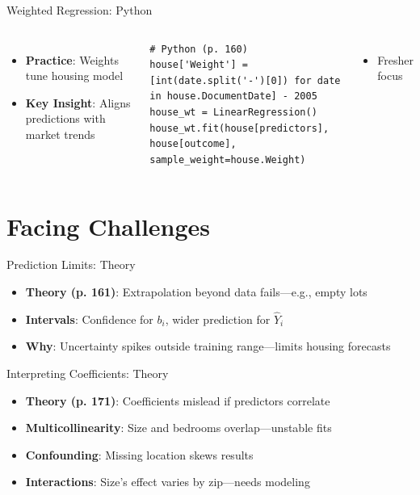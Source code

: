 \documentclass{beamer}
\begin{document}
	\begin{frame}[fragile]{Weighted Regression: Python}
		\lstset{language=Python}
		\begin{columns}
			\begin{itemize}
				\item \textbf{Practice}: Weights tune housing model
				\item \textbf{Key Insight}: Aligns predictions with market trends
			\end{itemize}
			\begin{lstlisting}
# Python (p. 160)
house['Weight'] = [int(date.split('-')[0]) for date in house.DocumentDate] - 2005
house_wt = LinearRegression()
house_wt.fit(house[predictors], house[outcome], sample_weight=house.Weight)
			\end{lstlisting}
			\begin{itemize}
				\item Fresher focus
			\end{itemize}
		\end{columns}
	\end{frame}
	
	\section{Facing Challenges}
	
	\begin{frame}{Prediction Limits: Theory}
		\begin{itemize}
			\item \textbf{Theory (p. 161)}: Extrapolation beyond data fails—e.g., empty lots
			\item \textbf{Intervals}: Confidence for $b_i$, wider prediction for $\hat{Y}_i$
			\item \textbf{Why}: Uncertainty spikes outside training range—limits housing forecasts
		\end{itemize}
	\end{frame}
	
	\begin{frame}{Interpreting Coefficients: Theory}
		\begin{itemize}
			\item \textbf{Theory (p. 171)}: Coefficients mislead if predictors correlate
			\item \textbf{Multicollinearity}: Size and bedrooms overlap—unstable fits
			\item \textbf{Confounding}: Missing location skews results
			\item \textbf{Interactions}: Size’s effect varies by zip—needs modeling
		\end{itemize}
	\end{frame}
	
\end{document}
